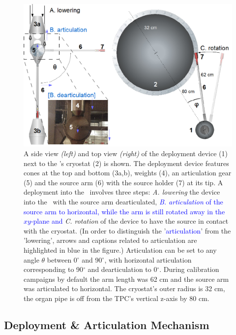 \begin{figure}[htbp]
 \centering
\includegraphics[width=\textwidth]{Figures/DeploymentDevice_XY_view2} %
  \caption{A side view \textit{(left)} and top view \textit{(right)} of the deployment device (1) next to the \tpc's cryostat (2) is shown. The deployment device features cones at the top and bottom (3a,b), weights (4), an articulation gear (5) and the source arm (6) with the source holder (7) at its tip. A deployment into the \lsv\ involves three steps: \textit{A. lowering} the device into the \lsv\ with the source arm dearticulated, \textcolor{blue}{\textit{B. articulation} of the source arm to horizontal, while the arm is still rotated away in the $xy$-plane and} \textit{C. rotation} of the device to have the source in contact with the cryostat. (In order to distinguish the '\textcolor{blue}{articulation}' from the 'lowering', arrows and captions related to articulation are highlighted in blue in the figure.) Articulation can be set to any angle $\theta$ between 0$^{\circ}$ and 90$^{\circ}$, with horizontal articulation corresponding to 90$^{\circ}$ and dearticulation to 0$^{\circ}$. During calibration campaigns by default the arm length was 62 cm and the source arm was articulated to horizontal. The cryostat's outer radius is 32 cm, the organ pipe is off from the TPC's vertical z-axis by 80 cm.\label{fig:DeploymentDevice}}
\end{figure} 


\subsection{Deployment \& Articulation Mechanism}\label{sec:DeploymentArticulation}

